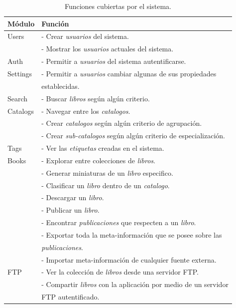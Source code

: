\documentclass[letter,12pt]{article}
\begin{document}
\begin{table}
\begin{tabular}{l|l}
Módulo   & Función                                                     \\
\hline
Users    & - Crear \emph{usuarios} del sistema.                          \\
         & - Mostrar los \emph{usuarios} actuales del sistema.            \\
Auth     & - Permitir a \emph{usuarios} del sistema autentificarse.        \\
Settings & - Permitir a \emph{usuarios} cambiar algunas de sus propiedades  \\
         & establecidas.                                                     \\ 
Search   & - Buscar \emph{libros} según algún criterio.                       \\
Catalogs & - Navegar entre los \emph{catalogos}.                               \\
         & - Crear \emph{catalogos} según algún criterio de agrupación.         \\
         & - Crear \emph{sub-catalogos} según algún criterio de especialización. \\
Tags     & - Ver las \emph{etiquetas} creadas en el sistema.                      \\
Books    & - Explorar entre colecciones de \emph{libros}.                          \\
         & - Generar miniaturas de un \emph{libro} especifico.                      \\
         & - Clasificar un \emph{libro} dentro de un \emph{catalogo}.                \\
         & - Descargar un \emph{libro}.                                               \\
         & - Publicar un \emph{libro}.                                                 \\
         & - Encontrar \emph{publicaciones} que respecten a un \emph{libro}.            \\
         & - Exportar toda la meta-información que se posee sobre las                    \\
         & \emph{publicaciones}.                                                          \\
         & - Importar meta-información de cualquier fuente externa.                        \\
FTP      & - Ver la colección de \emph{libros} desde una servidor FTP.                      \\
         & - Compartir \emph{libros} con la aplicación por medio de un servidor              \\
         & FTP autentificado.                                                                 \\
\end{tabular}
\caption{Funciones cubiertas por el sistema.}
\label{funciones_actuales}
\end{table}
\end{document}
